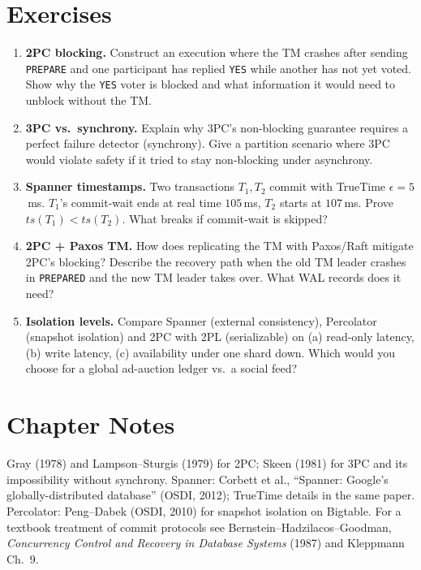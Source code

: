 \section{Exercises}
\label{sec:ch07-exercises}
\begin{enumerate}[label=E7.\arabic*, leftmargin=*, itemsep=0.6em]
    \item \textbf{2PC blocking.} Construct an execution where the TM crashes after sending \texttt{PREPARE} and one participant has replied \texttt{YES} while another has not yet voted. Show why the \texttt{YES} voter is blocked and what information it would need to unblock without the TM.
    \item \textbf{3PC vs.\ synchrony.} Explain why 3PC's non-blocking guarantee requires a perfect failure detector (synchrony). Give a partition scenario where 3PC would violate safety if it tried to stay non-blocking under asynchrony.
    \item \textbf{Spanner timestamps.} Two transactions $T_1,T_2$ commit with TrueTime $\epsilon=5$\,ms. $T_1$'s commit-wait ends at real time $105$\,ms, $T_2$ starts at $107$\,ms. Prove $ts(T_1)<ts(T_2)$. What breaks if commit-wait is skipped?
    \item \textbf{2PC + Paxos TM.} How does replicating the TM with Paxos/Raft mitigate 2PC's blocking? Describe the recovery path when the old TM leader crashes in \texttt{PREPARED} and the new TM leader takes over. What WAL records does it need?
    \item \textbf{Isolation levels.} Compare Spanner (external consistency), Percolator (snapshot isolation) and 2PC with 2PL (serializable) on (a) read-only latency, (b) write latency, (c) availability under one shard down. Which would you choose for a global ad-auction ledger vs.\ a social feed?
\end{enumerate}

\section*{Chapter Notes}
Gray (1978) and Lampson--Sturgis (1979) for 2PC; Skeen (1981) for 3PC and its impossibility without synchrony. Spanner: Corbett et al., ``Spanner: Google's globally-distributed database'' (OSDI, 2012); TrueTime details in the same paper. Percolator: Peng--Dabek (OSDI, 2010) for snapshot isolation on Bigtable. For a textbook treatment of commit protocols see Bernstein--Hadzilacos--Goodman, \emph{Concurrency Control and Recovery in Database Systems} (1987) and Kleppmann Ch.~9.

